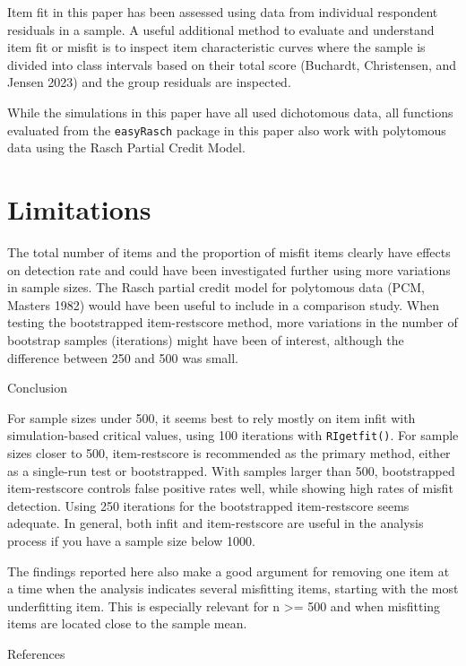 \documentclass[
  letterpaper,
  DIV=11,
  numbers=noendperiod]{scrartcl}
\begin{document}
Item fit in this paper has been assessed using data from individual
respondent residuals in a sample. A useful additional method to evaluate
and understand item fit or misfit is to inspect item characteristic
curves where the sample is divided into class intervals based on their
total score (Buchardt, Christensen, and Jensen 2023) and the group
residuals are inspected.

While the simulations in this paper have all used dichotomous data, all
functions evaluated from the \texttt{easyRasch} package in this paper
also work with polytomous data using the Rasch Partial Credit Model.

\section{Limitations}\label{limitations}

The total number of items and the proportion of misfit items clearly
have effects on detection rate and could have been investigated further
using more variations in sample sizes. The Rasch partial credit model
for polytomous data (PCM, Masters 1982) would have been useful to
include in a comparison study. When testing the bootstrapped
item-restscore method, more variations in the number of bootstrap
samples (iterations) might have been of interest, although the
difference between 250 and 500 was small.

Conclusion

For sample sizes under 500, it seems best to rely mostly on item infit
with simulation-based critical values, using 100 iterations with
\texttt{RIgetfit()}. For sample sizes closer to 500, item-restscore is
recommended as the primary method, either as a single-run test or
bootstrapped. With samples larger than 500, bootstrapped item-restscore
controls false positive rates well, while showing high rates of misfit
detection. Using 250 iterations for the bootstrapped item-restscore
seems adequate. In general, both infit and item-restscore are useful in
the analysis process if you have a sample size below 1000.

The findings reported here also make a good argument for removing one
item at a time when the analysis indicates several misfitting items,
starting with the most underfitting item. This is especially relevant
for n \textgreater= 500 and when misfitting items are located close to
the sample mean.

References
\end{document}
